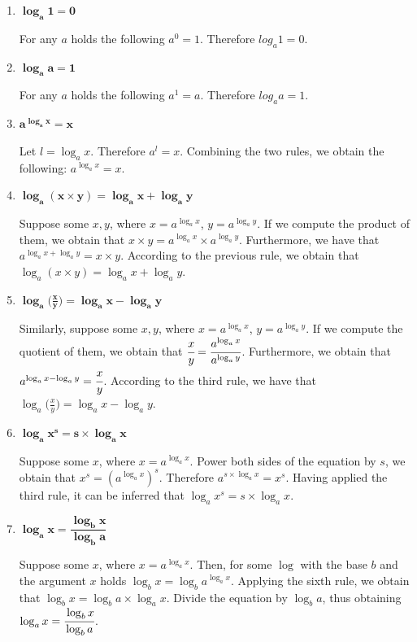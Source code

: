 \documentclass[10pt,a4paper]{article}
\begin{document}
\begin{enumerate}
    \item{$\boldsymbol{\log_a 1 = 0}$}  %

    For any $a$ holds the following $a^0 = 1$. Therefore $log_a 1 = 0$.
    
    \item{$\boldsymbol{\log_a a = 1}$}  %

    For any $a$ holds the following $a^1 = a$. Therefore $log_a a = 1$.

    \item{$\boldsymbol{a^{\log_a x} = x}$}  %

    Let $l = \log_a x$. Therefore $a^{l} = x$. Combining the two rules, we obtain the following:
    $a^{\log_a x} = x$.

    \item{$\boldsymbol{\log_a (x \times y) = \log_a x + \log_a y}$}  %
    
    Suppose some $x,y$, where $x = a^{\log_a x}$, $y = a^{\log_a y}$. If we compute the product
    of them, we obtain that $x \times y = a^{\log_a x} \times a^{\log_a y}$. Furthermore, we 
    have that $a^{\log_a x + \log_a y} = x \times y$. According to the previous rule, we 
    obtain that $\log_a (x \times y) = \log_a x + \log_a y$.

    \item{$\boldsymbol{\log_a \Big( \frac{x}{y} \Big) = \log_a x - \log_a y}$}  %
    
    Similarly, suppose some $x,y$, where $x = a^{\log_a x}$, $y = a^{\log_a y}$. If we compute 
    the quotient of them, we obtain that $\cfrac{x}{y} = \cfrac{a^{\log_a x}}{a^{\log_a y}}$. 
    Furthermore,  we obtain that $a^{\log_a x - \log_a y} = \cfrac{x}{y}$. According to the third 
    rule, we have that $\log_a \big(\frac{x}{y}\big) = \log_a x - \log_a y$.

    \item{$\boldsymbol{\log_a x^{s} = s \times \log_a x}$}  %

    Suppose some $x$, where $x = a^{\log_a x}$. Power both sides of the equation by $s$, we 
    obtain that $x^{s} = (a^{\log_a x})^{s}$. Therefore $a^{s \times \log_a x} = x^{s}$.
    Having applied the third rule, it can be inferred that $\log_a x^{s} = s \times \log_a x$.

    \item{$\boldsymbol{\log_a x = \dfrac{\log_b x}{\log_b a}}$}  %

    Suppose some $x$, where $x = a^{\log_a x}$. Then, for some $\log$ with the base $b$ and the 
    argument $x$ holds $\log_b x = \log_b a^{\log_a x}$. Applying the sixth rule, we obtain that
    $\log_b x = \log_b a \times \log_a x$. Divide the equation by $\log_b a$, thus obtaining
    $\log_a x = \cfrac{\log_b x}{\log_b a}$.


\end{enumerate}
    
\end{document}
